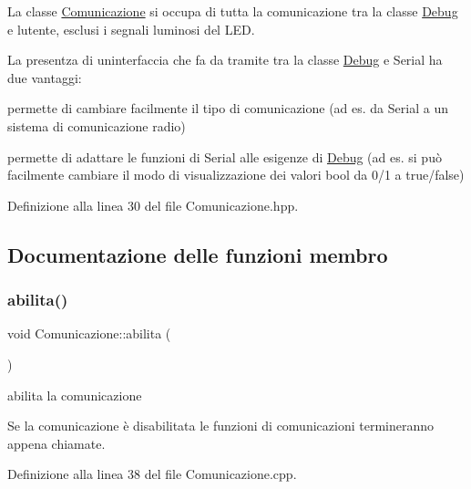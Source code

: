 La classe {\ttfamily \hyperlink{class_comunicazione}{Comunicazione}} si occupa di tutta la comunicazione tra la classe \hyperlink{class_debug}{Debug} e l\textquotesingle{}utente, esclusi i segnali luminosi del L\+ED.

La presentza di un\textquotesingle{}interfaccia che fa da tramite tra la classe \hyperlink{class_debug}{Debug} e Serial ha due vantaggi\+:


\begin{DoxyItemize}
\item permette di cambiare facilmente il tipo di comunicazione (ad es. da Serial a un sistema di comunicazione radio)
\item permette di adattare le funzioni di Serial alle esigenze di \hyperlink{class_debug}{Debug} (ad es. si può facilmente cambiare il modo di visualizzazione dei valori bool da 0/1 a true/false) 
\end{DoxyItemize}

Definizione alla linea 30 del file Comunicazione.\+hpp.



\subsection{Documentazione delle funzioni membro}
\mbox{\label{class_comunicazione_a08e76063956fc38d54002d8f17786cb6}} 
\subsubsection{\texorpdfstring{abilita()}{abilita()}}
{\footnotesize\ttfamily void Comunicazione\+::abilita (\begin{DoxyParamCaption}{ }\end{DoxyParamCaption})}



abilita la comunicazione 

Se la comunicazione è disabilitata le funzioni di comunicazioni termineranno appena chiamate. 

Definizione alla linea 38 del file Comunicazione.\+cpp.

\mbox{\label{class_comunicazione_a1539a3f6cc41da10ac5b1b41493ce94d}} 
